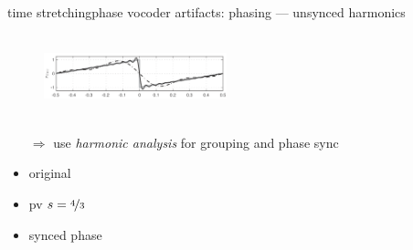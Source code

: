 	\begin{frame}{time stretching}{phase vocoder artifacts: phasing --- unsynced harmonics}
                        \begin{figure}
                            \centering
                                \includegraphics[width=5.3cm,height=2.4cm]{graph/gibbs}
                        \end{figure}
        \pause
                \begin{itemize}
                    \item[$\Rightarrow$] use \textit{harmonic analysis} for grouping and phase sync
                \end{itemize}
                        \begin{itemize}
                            \item   original  
                            \item   pv $s = \nicefrac{4}{3}$ 
                            \item   synced phase 
                        \end{itemize}
        \vspace{50mm}
    \end{frame}
